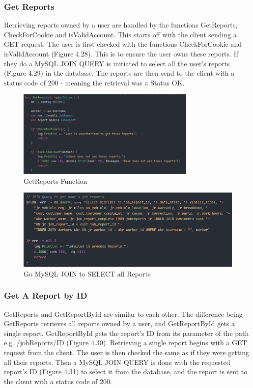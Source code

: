 \subsubsection{Get Reports}
Retrieving reports owned by a user are handled by the functions GetReports, CheckForCookie and isValidAccount. This starts off with the client sending a GET request. The user is first checked with the functions CheckForCookie and isValidAccount (Figure 4.28). This is to ensure the user owns these reports. If they do a MySQL JOIN QUERY is initiated to select all the user's reports (Figure 4.29) in the database. The reports are then send to the client with a status code of 200 - meaning the retrieval was a Status OK.

\begin{figure}[H]
    \caption{GetReports Function}
    \label{image:getReports}
    \centering
    \includegraphics[width=0.78\textwidth]{images/horton/report_system/get_reports.png}
\end{figure}

\begin{figure}[H]
    \caption{Go MySQL JOIN to SELECT all Reports}
    \label{image:go_mysql_join}
    \centering
    \includegraphics[width=1.0\textwidth]{images/horton/report_system/go_mysql_join.png}
\end{figure}

\subsubsection{Get A Report by ID}
GetReports and GetReportById are similar to each other. The difference being GetReports retrieves all reports owned by a user, and GetReportById gets a single report. GetReportById gets the report's ID from its parameter of the path e.g. /jobReports/ID (Figure 4.30). Retrieving a single report begins with a GET request from the client. The user is then checked the same as if they were getting all their reports. Then a MySQL JOIN QUERY is done with the requested report's ID (Figure 4.31) to select it from the database, and the report is sent to the client with a status code of 200.

